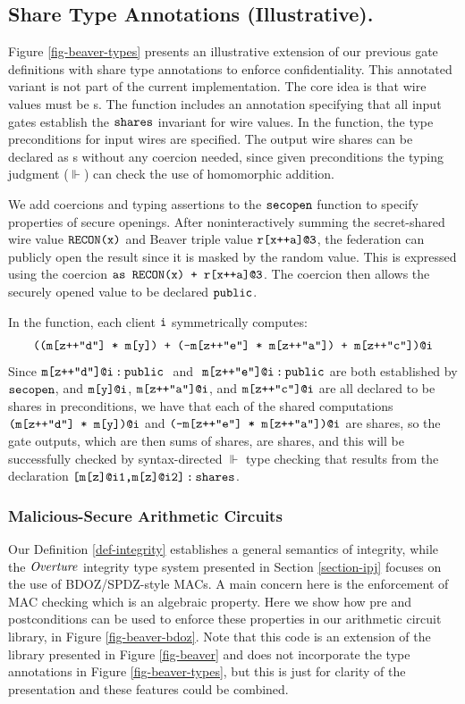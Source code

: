\subsection{Share Type Annotations (Illustrative).}

Figure \ref{fig-beaver-types} presents an illustrative extension of our
previous gate definitions with share type annotations to enforce
confidentiality. This annotated variant is not part of the current
implementation. The core idea is that wire values must be s. The
 function includes an annotation specifying that all input gates
establish the $\texttt{shares}$ invariant for wire values. In the 
function, the  type preconditions for input wires are specified. The
output wire shares can be declared as s without any coercion needed,
since given preconditions the typing judgment ($\Vdash$) can check the use of
homomorphic addition.

We add coercions and typing assertions to the $\texttt{secopen}$ function
to specify properties of secure openings. After noninteractively
summing the secret-shared wire value $\texttt{RECON(x)}$ and Beaver triple value
$\texttt{r[x++a]@3}$, the federation can publicly open the result since it is
masked by the random value. This is expressed using the coercion
$\texttt{as RECON(x) +  r[x++a]@3}$. The coercion then allows the
securely opened value to be declared $\texttt{public}$.

In the  function, each client $\texttt{i}$ symmetrically
computes:
$$
\texttt{((m[z++"d"] * m[y]) + (-m[z++"e"] * m[z++"a"]) + m[z++"c"])@i}
$$
Since $\texttt{m[z++"d"]@i\,:\,public}\ $ and $\ \texttt{m[z++"e"]@i\,:\,public}$
are both established by $\texttt{secopen}$, and
$\texttt{m[y]@i}$, $\texttt{m[z++"a"]@i}$, and $\texttt{m[z++"c"]@i}$ are
all declared to be shares in preconditions, we have that each
of the shared computations $\texttt{(m[z++"d"] * m[y])@i}$ and $\texttt{(-m[z++"e"] * m[z++"a"])@i}$
are shares, so the gate outputs, which are then sums of shares, are shares, and this will
be successfully checked by syntax-directed $\Vdash$ type checking that
results from the declaration $\texttt{[m[z]@i1,m[z]@i2]\,:\,shares}$. 

\subsubsection{Malicious-Secure Arithmetic Circuits}

Our Definition \ref{def-integrity} establishes a general semantics of
integrity, while the $\mathit{Overture}$ integrity type system presented in
Section \ref{section-ipj} focuses on the use of BDOZ/SPDZ-style
MACs. A main concern here is the enforcement of MAC checking which is
an algebraic property. Here we show how pre and postconditions can be
used to enforce these properties in our arithmetic circuit library, in
Figure \ref{fig-beaver-bdoz}. Note that this code is an extension of the
library presented in Figure \ref{fig-beaver} and does not incorporate
the type annotations in Figure \ref{fig-beaver-types}, but this is
just for clarity of the presentation and these features could be combined. 

